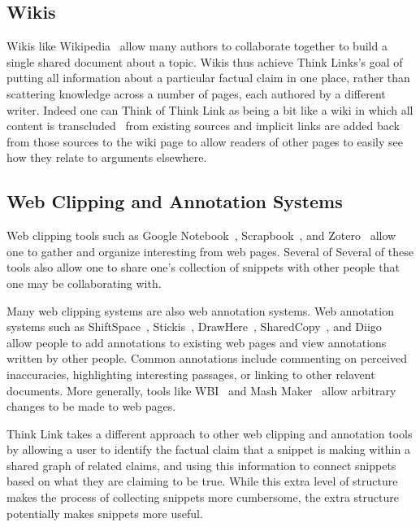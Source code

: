 \documentclass{chi2009}
\begin{document}
\subsection{Wikis}

Wikis like Wikipedia~\cite{wikipedia} allow many authors to collaborate together to build a single shared document about a topic. Wikis thus achieve Think Links's goal of putting all information about a particular factual claim in one place, rather than scattering knowledge across a number of pages, each authored by a different writer. Indeed one can Think of Think Link as being a bit like a wiki in which all content is transcluded~\cite{transclusion} from existing sources and implicit links are added back from those sources to the wiki page to allow readers of other pages to easily see how they relate to arguments elsewhere.

\subsection{Web Clipping and Annotation Systems}

Web clipping tools such as Google Notebook~\cite{googlenotebook}, Scrapbook~\cite{scrapbook}, and Zotero~\cite{zotero} allow one to gather and organize interesting from web pages. Several of Several of these tools also allow one to share one's collection of snippets with other people that one may be collaborating with. 

Many web clipping systems are also web annotation systems. Web annotation systems such as ShiftSpace~\cite{shiftspace}, Stickis~\cite{stickis}, DrawHere~\cite{drawhere}, SharedCopy~\cite{sharedcopy}, and Diigo~\cite{diigo} allow people to add annotations to existing web pages and view annotations written by other people. Common annotations include commenting on perceived inaccuracies, highlighting interesting passages, or linking to other relavent documents. More generally, tools like WBI~\cite{personalweb} and Mash Maker~\cite{mashmaker} allow arbitrary changes to be made to web pages.

Think Link takes a different approach to other web clipping and annotation tools by allowing a user to identify the factual claim that a snippet is making within a shared graph of related claims, and using this information to connect snippets based on what they are claiming to be true. While this extra level of structure makes the process of collecting snippets more cumbersome, the extra structure potentially makes snippets more useful.
\end{document}
